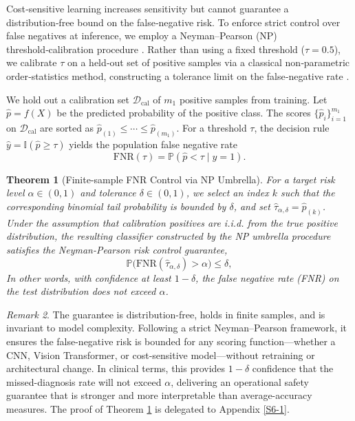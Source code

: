 \documentclass[journal]{IEEEtran}
\newtheorem{theorem}{Theorem}[section]
\theoremstyle{remark}
\newtheorem{remark}[theorem]{Remark}
\begin{document}
Cost‑sensitive learning increases sensitivity but cannot guarantee a distribution‑free bound on the false‑negative risk. To enforce strict control over false negatives at inference, we employ a Neyman–Pearson (NP) threshold‑calibration procedure \cite{rigollet2011neyman,tong2018neyman}. Rather than using a fixed threshold (\(\tau = 0.5\)), we calibrate \(\tau\) on a held‑out set of positive samples via a classical non‑parametric order‑statistics method, constructing a tolerance limit on the false‑negative rate \cite{wilks1941determination}.

We hold out a calibration set $\mathcal{D}_{\mathrm{cal}}$ of $m_1$ positive samples from training. Let $\hat{p} = f(X)$ be the predicted probability of the positive class. The scores $\{\hat{p}_i\}_{i=1}^{m_1}$ on $\mathcal{D}_{\mathrm{cal}}$ are sorted as $\hat{p}_{(1)} \le \cdots \le \hat{p}_{(m_1)}$. For a threshold $\tau$, the decision rule $\hat{y} = \mathbb{I}(\hat{p} \ge \tau)$ yields the population false negative rate
\[
\mathrm{FNR}(\tau) = \mathbb{P}(\hat{p} < \tau \mid y = 1).
\]

\begin{theorem}[Finite-sample FNR Control via NP Umbrella]\label{Th1}
For a target risk level $\alpha\in(0,1)$ and tolerance $\delta\in(0,1)$, we select an index $k$ such that the corresponding binomial tail probability is bounded by $\delta$, and set $\hat{\tau}_{\alpha,\delta} = \hat{p}_{(k)}$. Under the assumption that calibration positives are i.i.d. from the true positive distribution, the resulting classifier constructed by the NP umbrella procedure satisfies the Neyman-Pearson risk control guarantee,
\[
\mathbb{P}\bigl(\mathrm{FNR}(\hat{\tau}_{\alpha,\delta}) > \alpha\bigr)
\leq \delta,
\]
In other words, with confidence at least $1-\delta$, the false negative rate (FNR) on the test distribution does not exceed $\alpha$.
\end{theorem}

\begin{remark}
The guarantee is distribution-free, holds in finite samples, and is invariant to model complexity. Following a strict Neyman--Pearson framework, it ensures the false-negative risk is bounded for any scoring function---whether a CNN, Vision Transformer, or cost-sensitive model---without retraining or architectural change. In clinical terms, this provides $1-\delta$ confidence that the missed-diagnosis rate will not exceed $\alpha$, delivering an operational safety guarantee that is stronger and more interpretable than average-accuracy measures. The proof of Theorem \ref{Th1} is delegated to Appendix \ref{S6-1}.
\end{remark}
\end{document}
